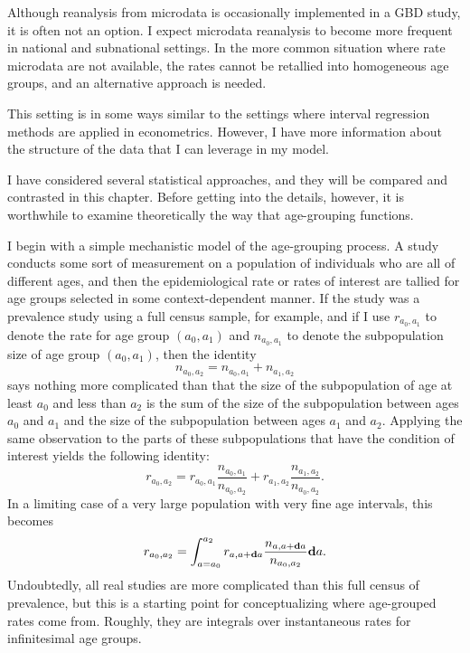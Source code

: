Although reanalysis from microdata is occasionally implemented in a GBD study,
it is often not an option.  I expect microdata
reanalysis to become more frequent in national and subnational
settings.  In the more common situation where rate microdata are not
available, the rates cannot be retallied into homogeneous age groups,
and an alternative approach is needed.

This setting is in some ways similar to the settings where interval
regression methods are applied in
econometrics.\cite{amemiya_regression_1973,manski_inference_2002,cook_partially_2012}
However, I have more
information about the structure of the data that I can leverage in my
model.

I have considered several statistical approaches, and
they will be compared and contrasted in this chapter.  Before getting
into the details, however, it is worthwhile to examine theoretically
the way that age-grouping functions.

I begin with a simple mechanistic model of the age-grouping process.
A study conducts some sort of measurement on a population of
individuals who are all of different ages, and then the
epidemiological rate or rates of interest are tallied for age groups
selected in some context-dependent manner. If the study was a
prevalence study using a full census sample, for example, and if I use
$r_{a_0,a_1}$ to denote the rate for age group $(a_0, a_1)$ and
$n_{a_0,a_1}$ to denote the subpopulation size of age group
$(a_0,a_1)$, then the identity
\[
n_{a_0, a_2} = n_{a_0,a_1} + n_{a_1,a_2}
\]
says nothing more complicated than that the size of the subpopulation
of age at least $a_0$ and less than $a_2$ is the sum of the size of
the subpopulation between ages $a_0$ and $a_1$ and the size of the
subpopulation between ages $a_1$ and $a_2$.  Applying the same
observation to the parts of these subpopulations that have the condition
of interest yields the following identity:
\[
r_{a_0,a_2} = r_{a_0,a_1}\frac{n_{a_0,a_1}}{n_{a_0,a_2}} + r_{a_1,a_2}\frac{n_{a_1,a_2}}{n_{a_0,a_2}}.
\]
In a limiting case of a very large population with very fine age
intervals, this becomes
\[
r_{a_0,a_2} = \int_{a=a_0}^{a_2} r_{a,a+\mathbf{d} a}\frac{n_{a,a+\mathbf{d} a}}{n_{a_0,a_2}}\mathbf{d} a.
\]
Undoubtedly, all real studies are more complicated than this full
census of prevalence, but this is a starting point for conceptualizing
where age-grouped rates come from.  Roughly, they are integrals over
instantaneous rates for infinitesimal age groups.

